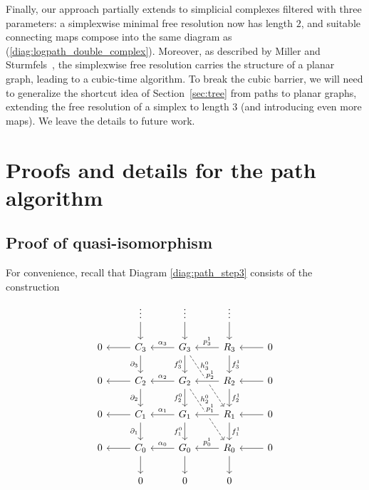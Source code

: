 \documentclass[a4paper,UKenglish,cleveref,nolineno,autoref]{socg-lipics-v2021}
\begin{document}
Finally, our approach partially extends to simplicial complexes
filtered with three parameters: a simplexwise minimal free resolution now has length
$2$, and suitable connecting maps compose into the same diagram as 
(\ref{diag:logpath_double_complex}).
Moreover, as described by
Miller and Sturmfels~\cite{miller_sturmfels_book}, the simplexwise
free resolution carries the structure of a planar graph,
leading to a cubic-time algorithm. 
To break the cubic barrier, we will need to generalize the shortcut idea
of Section~\ref{sec:tree}
from paths to planar graphs, extending the free resolution of a simplex
to length $3$ (and introducing even more maps). We leave the details to future work.

\newpage






\newpage


\appendix

\section{Proofs and details for the path algorithm}
\label{app:path}

\subsection{Proof of quasi-isomorphism} 
\label{app:path_correctness}

For convenience, recall that Diagram \eqref{diag:path_step3} consists of the construction 
\begin{equation}
\label{diag:app_path_double}
\begin{tikzcd}
& \vdots \arrow[d] & \vdots \arrow[d] & \vdots \arrow[d] \\
0 & C_3 \arrow[l] \arrow[d,swap,"\partial_3"] & G_3 \arrow[l,swap,"\alpha_3"] \arrow[d,swap,"f^0_3"] \arrow[ddr,dashed,"h^0_3"{xshift=-9pt,yshift=9pt}] & R_3 \arrow[l,swap,"p^1_3"] \arrow[d,"f^1_3"] & 0 \arrow[l] \\
0 & C_2 \arrow[l] \arrow[d,swap,"\partial_2"] & G_2 \arrow[l,swap,"\alpha_2"] \arrow[d,swap,"f^0_2"] \arrow[ddr,dashed,"h^0_2"{xshift=-9pt,yshift=9pt}] & R_2 \arrow[l,swap,"p_2^1"{xshift=3pt},crossing over] \arrow[d,"f^1_2"] & 0 \arrow[l] \\
0 & C_1 \arrow[l] \arrow[d,swap,"\partial_1"] & G_1 \arrow[l,swap,"\alpha_1"] \arrow[d,swap,"f^0_1"] & R_1 \arrow[l,swap,"p^1_1"{xshift=3pt},crossing over] \arrow[d,"f^1_1"] & 0 \arrow[l] \\
0 & C_0 \arrow[l] \arrow[d] & G_0 \arrow[l,swap,"\alpha_0"] \arrow[d] & R_0 \arrow[l,swap,"p^1_0"] \arrow[d] & 0 \arrow[l] \\
& 0 & 0 & 0
\end{tikzcd}
\end{equation}
\end{document}
